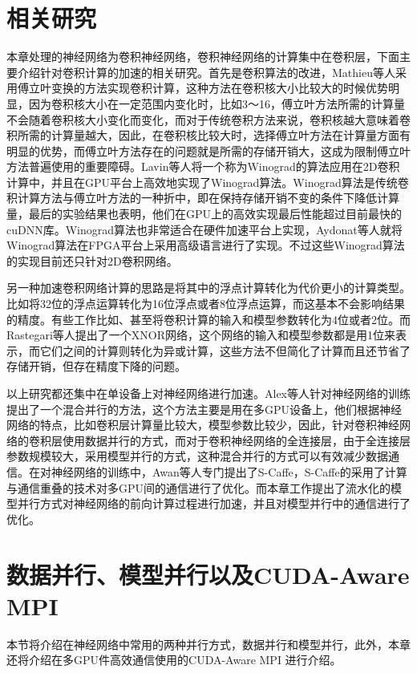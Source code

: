 \section{相关研究}
\label{relatedwork}
本章处理的神经网络为卷积神经网络，卷积神经网络的计算集中在卷积层，下面主要介绍针对卷积计算的加速的相关研究。首先是卷积算法的改进，Mathieu等人采用傅立叶变换的方法实现卷积计算，这种方法在卷积核大小比较大的时候优势明显，因为卷积核大小在一定范围内变化时，比如3～16，傅立叶方法所需的计算量不会随着卷积核大小变化而变化，而对于传统卷积方法来说，卷积核越大意味着卷积所需的计算量越大，因此，在卷积核比较大时，选择傅立叶方法在计算量方面有明显的优势，而傅立叶方法存在的问题就是所需的存储开销大，这成为限制傅立叶方法普遍使用的重要障碍。Lavin等人将一个称为Winograd的算法应用在2D卷积计算中，并且在GPU平台上高效地实现了Winograd算法。Winograd算法是传统卷积计算方法与傅立叶方法的一种折中，即在保持存储开销不变的条件下降低计算量，最后的实验结果也表明，他们在GPU上的高效实现最后性能超过目前最快的cuDNN库。Winograd算法也非常适合在硬件加速平台上实现，Aydonat等人就将Winograd算法在FPGA平台上采用高级语言进行了实现。不过这些Winograd算法的实现目前还只针对2D卷积网络。

另一种加速卷积网络计算的思路是将其中的浮点计算转化为代价更小的计算类型。比如将32位的浮点运算转化为16位浮点或者8位浮点运算，而这基本不会影响结果的精度。有些工作比如、甚至将卷积计算的输入和模型参数转化为4位或者2位。而Rastegari等人提出了一个XNOR网络，这个网络的输入和模型参数都是用1位来表示，而它们之间的计算则转化为异或计算，这些方法不但简化了计算而且还节省了存储开销，但存在精度下降的问题。

以上研究都还集中在单设备上对神经网络进行加速。Alex等人针对神经网络的训练提出了一个混合并行的方法，这个方法主要是用在多GPU设备上，他们根据神经网络的特点，比如卷积层计算量比较大，模型参数比较少，因此，针对卷积神经网络的卷积层使用数据并行的方式，而对于卷积神经网络的全连接层，由于全连接层参数规模较大，采用模型并行的方式，这种混合并行的方式可以有效减少数据通信。在对神经网络的训练中，Awan等人专门提出了S-Caffe，S-Caffe的采用了计算与通信重叠的技术对多GPU间的通信进行了优化。而本章工作提出了流水化的模型并行方式对神经网络的前向计算过程进行加速，并且对模型并行中的通信进行了优化。

\section{数据并行、模型并行以及CUDA-Aware MPI}
本节将介绍在神经网络中常用的两种并行方式，数据并行和模型并行，此外，本章还将介绍在多GPU件高效通信使用的CUDA-Aware MPI 进行介绍。

